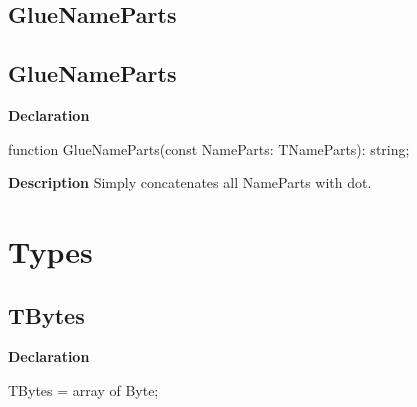 \documentclass{report}
\newif\ifpdf
\begin{document}
\subsection*{\large{\textbf{GlueNameParts}}\normalsize\hspace{1ex}\hrulefill}
\else
\subsection*{GlueNameParts}
\fi
\label{PasDoc_Types-GlueNameParts}
\begin{list}{}{
\setlength{\itemindent}{0cm}
\setlength{\listparindent}{0cm}
\setlength{\leftmargin}{\evensidemargin}
\addtolength{\leftmargin}{\tmplength}
\settowidth{\labelsep}{X}
\addtolength{\leftmargin}{\labelsep}
\setlength{\labelwidth}{\tmplength}
}
\item[\textbf{Declaration}\hfill]
\ifpdf
\begin{flushleft}
\fi
\begin{ttfamily}
function GlueNameParts(const NameParts: TNameParts): string;\end{ttfamily}

\ifpdf
\end{flushleft}
\fi

\par
\item[\textbf{Description}]
Simply concatenates all NameParts with dot.

\end{list}
\section{Types}
\ifpdf
\subsection*{\large{\textbf{TBytes}}\normalsize\hspace{1ex}\hrulefill}
\else
\subsection*{TBytes}
\fi
\label{PasDoc_Types-TBytes}
\begin{list}{}{
\setlength{\itemindent}{0cm}
\setlength{\listparindent}{0cm}
\setlength{\leftmargin}{\evensidemargin}
\addtolength{\leftmargin}{\tmplength}
\settowidth{\labelsep}{X}
\addtolength{\leftmargin}{\labelsep}
\setlength{\labelwidth}{\tmplength}
}
\item[\textbf{Declaration}\hfill]
\ifpdf
\begin{flushleft}
\fi
\begin{ttfamily}
TBytes = array of Byte;\end{ttfamily}

\ifpdf
\end{flushleft}
\fi

\end{list}
\ifpdf
\end{document}

